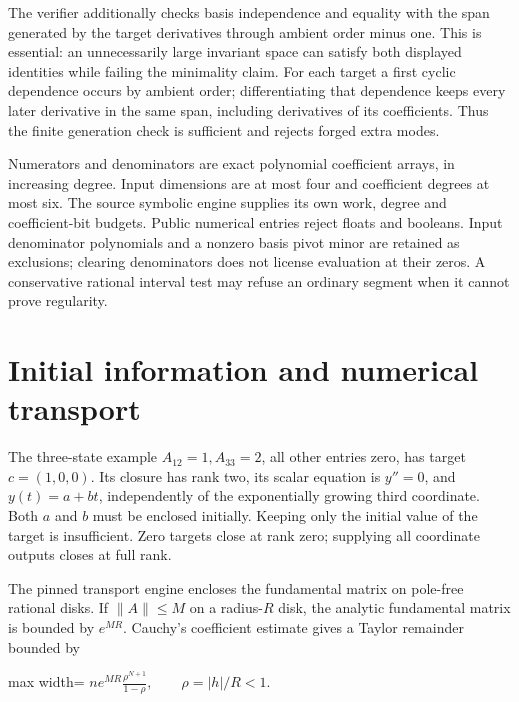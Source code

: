 \documentclass[
  11pt,
  a4paper,
]{report}
\begin{document}
The verifier additionally checks basis independence and equality with
the span generated by the target derivatives through ambient order minus
one. This is essential: an unnecessarily large invariant space can
satisfy both displayed identities while failing the minimality claim.
For each target a first cyclic dependence occurs by ambient order;
differentiating that dependence keeps every later derivative in the same
span, including derivatives of its coefficients. Thus the finite
generation check is sufficient and rejects forged extra modes.

Numerators and denominators are exact polynomial coefficient arrays, in
increasing degree. Input dimensions are at most four and coefficient
degrees at most six. The source symbolic engine supplies its own work,
degree and coefficient-bit budgets. Public numerical entries reject
floats and booleans. Input denominator polynomials and a nonzero basis
pivot minor are retained as exclusions; clearing denominators does not
license evaluation at their zeros. A conservative rational interval test
may refuse an ordinary segment when it cannot prove regularity.

\hypertarget{initial-information-and-numerical-transport}{%
\section{Initial information and numerical
transport}\label{initial-information-and-numerical-transport}}

The three-state example \(A_{12}=1,A_{33}=2\), all other entries zero,
has target \(c=(1,0,0)\). Its closure has rank two, its scalar equation
is \(y''=0\), and \(y(t)=a+bt\), independently of the exponentially
growing third coordinate. Both \(a\) and \(b\) must be enclosed
initially. Keeping only the initial value of the target is insufficient.
Zero targets close at rank zero; supplying all coordinate outputs closes
at full rank.

The pinned transport engine encloses the fundamental matrix on pole-free
rational disks. If \(\|A\|\le M\) on a radius-\(R\) disk, the analytic
fundamental matrix is bounded by \(e^{MR}\). Cauchy's coefficient
estimate gives a Taylor remainder bounded by

\begin{center}
\begin{adjustbox}{max width=\linewidth}
$\displaystyle
n e^{MR}\frac{\rho^{N+1}}{1-\rho},\qquad \rho=|h|/R<1.
$
\end{adjustbox}
\end{center}
\end{document}
